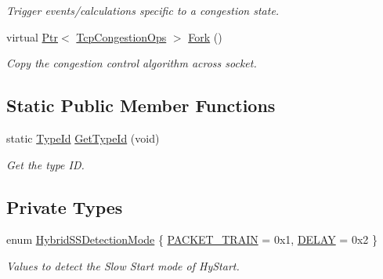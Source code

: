 \begin{DoxyCompactItemize}
\begin{DoxyCompactList}\small\item\em Trigger events/calculations specific to a congestion state. \end{DoxyCompactList}\item 
virtual \hyperlink{classns3_1_1Ptr}{Ptr}$<$ \hyperlink{classns3_1_1TcpCongestionOps}{Tcp\+Congestion\+Ops} $>$ \hyperlink{classns3_1_1TcpCubic_a27dd69b4c42308485dca5f0fa842fe2f}{Fork} ()
\begin{DoxyCompactList}\small\item\em Copy the congestion control algorithm across socket. \end{DoxyCompactList}\end{DoxyCompactItemize}
\subsection*{Static Public Member Functions}
\begin{DoxyCompactItemize}
\item 
static \hyperlink{classns3_1_1TypeId}{Type\+Id} \hyperlink{classns3_1_1TcpCubic_ad27bba0e96569c29fcd76e7926e96e75}{Get\+Type\+Id} (void)
\begin{DoxyCompactList}\small\item\em Get the type ID. \end{DoxyCompactList}\end{DoxyCompactItemize}
\subsection*{Private Types}
\begin{DoxyCompactItemize}
\item 
enum \hyperlink{classns3_1_1TcpCubic_adc8acf4d99d45daa4bff0c47dc9aa707}{Hybrid\+S\+S\+Detection\+Mode} \{ \hyperlink{classns3_1_1TcpCubic_adc8acf4d99d45daa4bff0c47dc9aa707a635d665963ba728e83d92142682d7e11}{P\+A\+C\+K\+E\+T\+\_\+\+T\+R\+A\+IN} = 0x1, 
\hyperlink{classns3_1_1TcpCubic_adc8acf4d99d45daa4bff0c47dc9aa707a17ded510b2f8e4fe197ae70dea628aa7}{D\+E\+L\+AY} = 0x2
 \}\begin{DoxyCompactList}\small\item\em Values to detect the Slow Start mode of Hy\+Start. \end{DoxyCompactList}
\end{DoxyCompactItemize}
